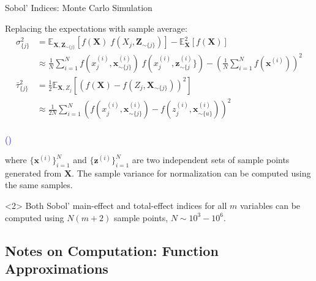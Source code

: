 \documentclass[english,aspectratio=169]{beamer}
\begin{document}
\begin{frame}[fragile]{Sobol' Indices: Monte Carlo Simulation}
  \small

\vspace{-1.25em}
  
Replacing the expectations with sample average:
\begin{align*}
  \sigma_{\{ j \}}^2 & = \mathbb{E}_{\bm{X}, \bm{Z}_{\sim \{ j \}}} \left[ f(\bm{X}) \; f(X_j, \bm{Z}_{\sim \{j\}}) \right] - \mathbb{E}^2_{\bm{X}} [f(\bm{X})] \\ 
  & \approx \frac{1}{N} \sum_{i = 1}^N f(x^{(i)}_j, \bm{x}^{(i)}_{\sim \{j\}}) \; f(x^{(i)}_j, \bm{z}^{(i)}_{\sim \{j}\}) - \left( \frac{1}{N} \sum_{i = 1}^N f(\bm{x}^{(i)}) \right)^2 \\
  \bar{\tau}_{\{ j \}}^2 & = \frac{1}{2} \mathbb{E}_{\bm{X}, Z_j} \left[ \left( f(\bm{X}) - f(Z_j, \bm{X}_{\sim \{j\}}) \right)^2 \right] \\
  & \approx \frac{1}{2N} \sum_{i = 1}^N \left( f(x^{(i)}_j, \bm{x}^{(i)}_{\sim \{j\}}) - f(z^{(i)}_j, \boldsymbol{x}^{(i)}_{\sim \{u\}}) \right)^2 \\
\end{align*}

\vspace{-2.0em}

{\hfill \raggedright \tiny \textcolor{blue}{(\cite{Saltelli2002,Saltelli2010})}}

\vspace{0.25em}

where $\{ \bm{x}^{(i)} \}_{i = 1}^N$ and $\{ \bm{z}^{(i)} \}_{i = 1}^N$ are two independent sets of sample points generated from $\bm{X}$.
The sample variance for normalization can be computed using the same samples.

\vspace{-0.5em}

\begin{exampleblock}<2>{}
  \centering
  Both Sobol' main-effect and total-effect indices for all $m$ variables
  can be computed using $N (m + 2)$ sample points, $N \sim 10^3-10^6$.
\end{exampleblock}

\end{frame}

\subsection{Notes on Computation: Function Approximations}
\end{document}
